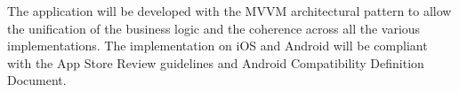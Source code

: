 The application will be developed with the MVVM architectural pattern to allow the unification of the business logic and the coherence across all the various implementations.
The implementation on iOS and Android will be compliant with the App Store Review guidelines and Android Compatibility Definition Document.

